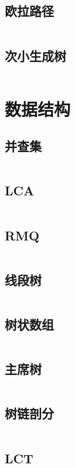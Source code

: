 \documentclass[a4paper,13.6pt]{article}
\begin{document}
\begin{CJK}{UTF8}{gbsn}
\subsection{欧拉路径}
\inputminted{c++}{../ACM_Template/Graph/Eular_Path.cpp}
\subsection{次小生成树}
\inputminted{c++}{../ACM_Template/Graph/Second_Minimal_Spanning_Tree.cpp}
\newpage

\section{数据结构}
\subsection{并查集}
\inputminted{c++}{../ACM_Template/Data_Structure/Union-Find_Set.cpp}
\subsection{LCA}
\inputminted{c++}{../ACM_Template/Data_Structure/LCA.cpp}
\subsection{RMQ}
\inputminted{c++}{../ACM_Template/Data_Structure/RMQ.cpp}
\subsection{线段树}
\inputminted{c++}{../ACM_Template/Data_Structure/Segment_Tree.cpp}
\subsection{树状数组}
\inputminted{c++}{../ACM_Template/Data_Structure/Binary_Indexed_Tree.cpp}
\subsection{主席树}
\inputminted{c++}{../ACM_Template/Data_Structure/Functional_Segment_Tree.cpp}
\subsection{树链剖分}
\inputminted{c++}{../ACM_Template/Data_Structure/Heavy-Light_Decomposition.cpp}
\subsection{LCT}
\inputminted{c++}{../ACM_Template/Data_Structure/LCT.cpp}

\end{CJK}
\end{document}

